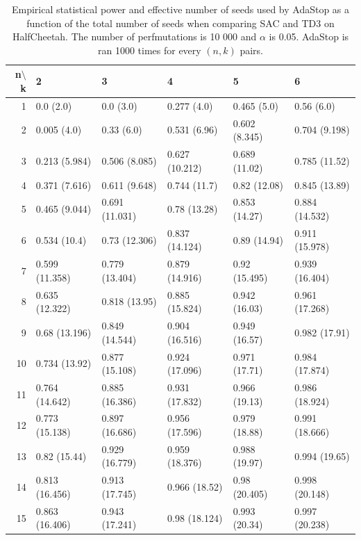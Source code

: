 \documentclass{article}
\theoremstyle{plain}
\theoremstyle{remark}
\newcommand{\1}{\mathbbm{1}}
\numberwithin{equation}{section}
\begin{document}
\begin{table}
	\centering
	\begin{tabular}{rlllll}
		\hline
		n$\setminus$k
		& 2              & 3              & 4              & 5             & 6              \\
		\hline
		1 & 0.0 (2.0)      & 0.0 (3.0)      & 0.277 (4.0)    & 0.465 (5.0)   & 0.56 (6.0)     \\
		2 & 0.005 (4.0)    & 0.33 (6.0)     & 0.531 (6.96)   & 0.602 (8.345) & 0.704 (9.198)  \\
		3 & 0.213 (5.984)  & 0.506 (8.085)  & 0.627 (10.212) & 0.689 (11.02) & 0.785 (11.52)  \\
		4 & 0.371 (7.616)  & 0.611 (9.648)  & 0.744 (11.7)   & 0.82 (12.08)  & 0.845 (13.89)  \\
		5 & 0.465 (9.044)  & 0.691 (11.031) & 0.78 (13.28)   & 0.853 (14.27) & 0.884 (14.532) \\
		6 & 0.534 (10.4)   & 0.73 (12.306)  & 0.837 (14.124) & 0.89 (14.94)  & 0.911 (15.978) \\
		7 & 0.599 (11.358) & 0.779 (13.404) & 0.879 (14.916) & 0.92 (15.495) & 0.939 (16.404) \\
		8 & 0.635 (12.322) & 0.818 (13.95)  & 0.885 (15.824) & 0.942 (16.03) & 0.961 (17.268) \\
		9 & 0.68 (13.196)  & 0.849 (14.544) & 0.904 (16.516) & 0.949 (16.57) & 0.982 (17.91)  \\
		10 & 0.734 (13.92)  & 0.877 (15.108) & 0.924 (17.096) & 0.971 (17.71) & 0.984 (17.874) \\
		11 & 0.764 (14.642) & 0.885 (16.386) & 0.931 (17.832) & 0.966 (19.13) & 0.986 (18.924) \\
		12 & 0.773 (15.138) & 0.897 (16.686) & 0.956 (17.596) & 0.979 (18.88) & 0.991 (18.666) \\
		13 & 0.82 (15.44)   & 0.929 (16.779) & 0.959 (18.376) & 0.988 (19.97) & 0.994 (19.65)  \\
		14 & 0.813 (16.456) & 0.913 (17.745) & 0.966 (18.52)  & 0.98 (20.405) & 0.998 (20.148) \\
		15 & 0.863 (16.406) & 0.943 (17.241) & 0.98 (18.124)  & 0.993 (20.34) & 0.997 (20.238) \\
		\hline
	\end{tabular}
\caption{Empirical statistical power and effective number of seeds used by AdaStop as a function of the total number of seeds when comparing SAC and TD3 on HalfCheetah. The number of perfmutations is 10 000 and $\alpha$ is 0.05. AdaStop is ran 1000 times for every $(n,k)$ pairs.\label{tab:stat_power_sactd3}}
\end{table}


\appendix




\end{document}
